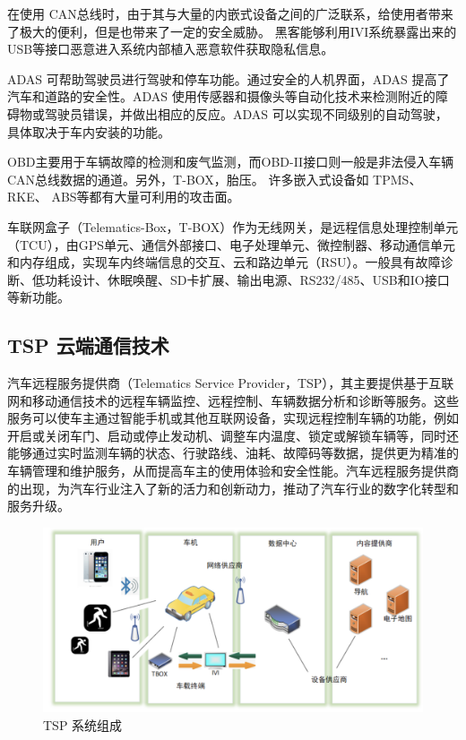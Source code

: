 在使用 CAN总线时，由于其与大量的内嵌式设备之间的广泛联系，给使用者带来了极大的便利，但是也带来了一定的安全威胁。
黑客能够利用IVI系统暴露出来的USB等接口恶意进入系统内部植入恶意软件获取隐私信息。

ADAS 可帮助驾驶员进行驾驶和停车功能。通过安全的人机界面，ADAS 提高了汽车和道路的安全性。ADAS 使用传感器和摄像头等自动化技术来检测附近的障碍物或驾驶员错误，并做出相应的反应。ADAS 可以实现不同级别的自动驾驶，具体取决于车内安装的功能。

OBD主要用于车辆故障的检测和废气监测，而OBD-II接口则一般是非法侵入车辆 CAN总线数据的通道。另外，T-BOX，胎压。
许多嵌入式设备如 TPMS、 RKE、 ABS等都有大量可利用的攻击面。

车联网盒子（Telematics-Box，T-BOX）作为无线网关，是远程信息处理控制单元（TCU），由GPS单元、通信外部接口、电子处理单元、微控制器、移动通信单元和内存组成，实现车内终端信息的交互、云和路边单元（RSU）。一般具有故障诊断、低功耗设计、休眠唤醒、SD卡扩展、输出电源、RS232/485、USB和IO接口等新功能。
\subsection{TSP 云端通信技术}

汽车远程服务提供商（Telematics Service Provider，TSP），其主要提供基于互联网和移动通信技术的远程车辆监控、远程控制、车辆数据分析和诊断等服务。这些服务可以使车主通过智能手机或其他互联网设备，实现远程控制车辆的功能，例如开启或关闭车门、启动或停止发动机、调整车内温度、锁定或解锁车辆等，同时还能够通过实时监测车辆的状态、行驶路线、油耗、故障码等数据，提供更为精准的车辆管理和维护服务，从而提高车主的使用体验和安全性能。汽车远程服务提供商的出现，为汽车行业注入了新的活力和创新动力，推动了汽车行业的数字化转型和服务升级。
 \begin{figure}
    \centering
    \includegraphics[scale=0.6]{resources/img/i2.png}
    \caption{TSP 系统组成}
  \end{figure}

